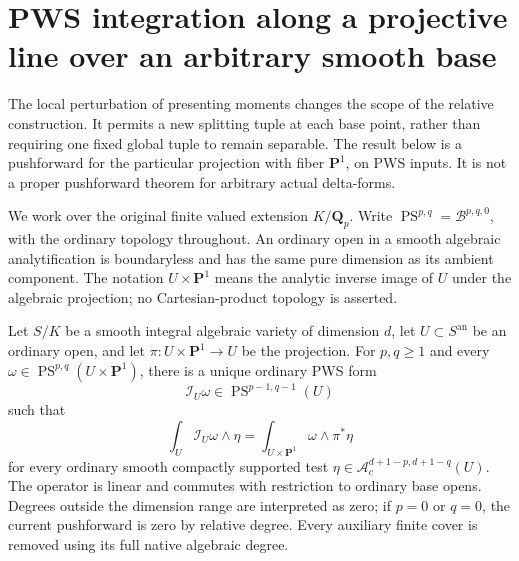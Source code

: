 \section{PWS integration along a projective line over an arbitrary smooth base}
\label{r15hp:section}

The local perturbation of presenting moments changes the scope of the
relative construction.  It permits a new splitting tuple at each base
point, rather than requiring one fixed global tuple to remain separable.
The result below is a pushforward for the particular projection with
fiber $\mathbf P^1$, on PWS inputs.  It is not a proper pushforward
theorem for arbitrary actual delta-forms.

We work over the original finite valued extension $K/\mathbf Q_p$.
Write $\operatorname{PS}^{p,q}=\mathcal B^{p,q,0}$, with the
ordinary topology throughout.  An ordinary open in a smooth algebraic
analytification is boundaryless and has the same pure dimension as its
ambient component.  The notation $U\times\mathbf P^1$ means the
analytic inverse image of $U$ under the algebraic projection; no
Cartesian-product topology is asserted.

\begin{theorem}
\label{r15hp:projection}
Let $S/K$ be a smooth integral algebraic variety of dimension $d$,
let $U\subset S^{\mathrm{an}}$ be an ordinary open, and let
$\pi:U\times\mathbf P^1\to U$ be the projection.
For $p,q\geq1$ and every
$\omega\in\operatorname{PS}^{p,q}(U\times\mathbf P^1)$,
there is a unique ordinary PWS form
\[
 \mathcal I_U\omega\in\operatorname{PS}^{p-1,q-1}(U)
\tag{HP15.1}\label{r15hp:output}
\]
such that
\[
 \int_U\mathcal I_U\omega\wedge\eta
       =\int_{U\times\mathbf P^1}\omega\wedge\pi^*\eta
\tag{HP15.2}\label{r15hp:all-smooth-pairing}
\]
for every ordinary smooth compactly supported test
$\eta\in\mathcal A_c^{d+1-p,d+1-q}(U)$.
The operator is linear and commutes with restriction to ordinary
base opens.  Degrees outside the dimension range are interpreted
as zero; if $p=0$ or $q=0$, the current pushforward is zero by
relative degree.  Every auxiliary finite cover is removed using
its full native algebraic degree.
\end{theorem}

